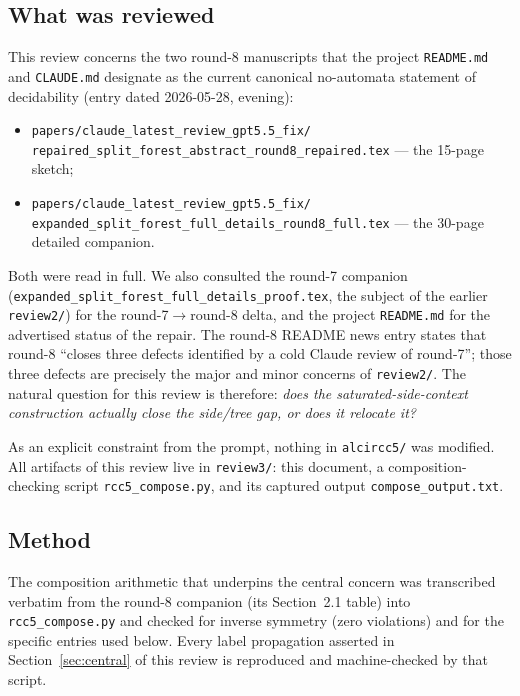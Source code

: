 \documentclass[11pt]{article}
\begin{document}
\subsection{What was reviewed}

This review concerns the two round-8 manuscripts that the project
\texttt{README.md} and \texttt{CLAUDE.md} designate as the current canonical
no-automata statement of decidability (entry dated 2026-05-28, evening):
\begin{itemize}
\item \texttt{papers/claude\_latest\_review\_gpt5.5\_fix/}\\
      \texttt{repaired\_split\_forest\_abstract\_round8\_repaired.tex} --- the
      15-page sketch;
\item \texttt{papers/claude\_latest\_review\_gpt5.5\_fix/}\\
      \texttt{expanded\_split\_forest\_full\_details\_round8\_full.tex} --- the
      30-page detailed companion.
\end{itemize}
Both were read in full.  We also consulted the round-7 companion
(\texttt{expanded\_split\_forest\_full\_details\_proof.tex}, the subject of the
earlier \texttt{review2/}) for the round-7$\to$round-8 delta, and the project
\texttt{README.md} for the advertised status of the repair.  The round-8 README
news entry states that round-8 ``closes three defects identified by a cold
Claude review of round-7''; those three defects are precisely the major and
minor concerns of \texttt{review2/}.  The natural question for this review is
therefore: \emph{does the saturated-side-context construction actually close the
side/tree gap, or does it relocate it?}

As an explicit constraint from the prompt, nothing in
\texttt{alcircc5/} was modified.  All artifacts of this review live in
\texttt{review3/}: this document, a composition-checking script
\texttt{rcc5\_compose.py}, and its captured output \texttt{compose\_output.txt}.

\subsection{Method}

The composition arithmetic that underpins the central concern was transcribed
verbatim from the round-8 companion (its Section~2.1 table) into
\texttt{rcc5\_compose.py} and checked for inverse symmetry (zero violations) and
for the specific entries used below.  Every label propagation asserted in
Section~\ref{sec:central} of this review is reproduced and machine-checked by
that script.
\end{document}
